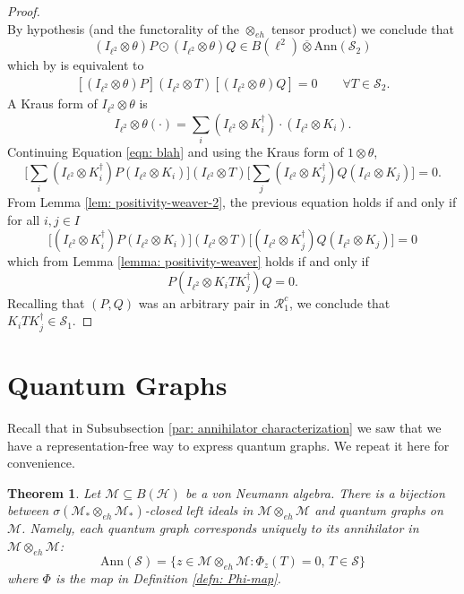 \documentclass[12pt]{article}
\newtheorem{theorem}{Theorem}[section]
\theoremstyle{definition}
\newcommand{\mc}[1]{\mathcal{#1}}
\newcommand{\<}{\langle}
\renewcommand{\>}{\rangle}
\newcommand{\Ann}{\text{Ann}}
\renewcommand{\subset}{\subseteq}
\newcommand{\eh}{\otimes_{eh}}
\begin{document}
\begin{proof}
\[    \]
    By hypothesis (and the functorality of the $\eh$ tensor product) we conclude that 
    \[
    (I_{\ell^2} \otimes \theta)P \odot(I_{\ell^2} \otimes \theta)Q \in B(\ell^2) \overline{\otimes} \Ann(\mc S_2)
    \]
    which by \cite[Theorem 3.3]{gp-obs} is equivalent to
    \begin{align} \label{eqn: blah}
    [(I_{\ell^2} \otimes \theta)P] (I_{\ell^2} \otimes T) [(I_{\ell^2} \otimes \theta)Q] = 0 \qquad \forall T \in \mc S_2.
    \end{align}
    A Kraus form of $I_{\ell^2} \otimes \theta$ is
    \[
    I_{\ell^2} \otimes \theta(\cdot) = \sum_i (I_{\ell^2} \otimes K_i^\dagger ) \cdot (I_{\ell^2} \otimes K_i ).
    \]
    Continuing Equation \ref{eqn: blah} and using the Kraus form of $1 \otimes \theta$,
    \[
    \bigg[\sum_i (I_{\ell^2} \otimes K_i^\dagger ) P(I_{\ell^2} \otimes K_i ) \bigg] (I_{\ell^2} \otimes T) \bigg[\sum_j (I_{\ell^2} \otimes K_j^\dagger ) Q(I_{\ell^2} \otimes K_j ) \bigg] = 0.
    \]
    From Lemma \ref{lem: positivity-weaver-2}, the previous equation holds if and only if for all $i,j \in I$
    \[
    \bigg[(I_{\ell^2} \otimes K_i^\dagger ) P(I_{\ell^2} \otimes K_i )\bigg] (I_{\ell^2} \otimes T) \bigg[(I_{\ell^2} \otimes K_j^\dagger ) Q(I_{\ell^2} \otimes K_j)\bigg]  = 0
    \]
    which from Lemma \ref{lemma: positivity-weaver} holds if and only if
    \[
    P(I_{\ell^2} \otimes K_iTK_j^\dagger) Q  = 0.
    \]
    Recalling that $(P,Q)$ was an arbitrary pair in $\mc R_1^c$, we conclude that $K_iTK_j^\dagger \in \mc S_1$. 
\end{proof}


\section{Quantum Graphs} \label{sec: limits-qgraphs}
Recall that in Subsubsection \ref{par: annihilator characterization} we saw that we have a representation-free way to express quantum graphs. We repeat it here for convenience.

\begin{theorem} 
    Let $\mc M \subset B(\mc H)$ be a von Neumann algebra. There is a bijection between $\sigma(\mc M_* \eh \mc M_*)$-closed left ideals in $\mc M \eh \mc M$ and quantum graphs on $\mc M$. Namely, each quantum graph corresponds uniquely to its annihilator in $\mc M \eh \mc M$:
    \[
    \Ann(\mc S) = \{z \in \mc M \otimes_{eh} \mc M : \Phi_z(T) = 0, \, T \in \mc S\}
    \]
    where $\Phi$ is the map in Definition \ref{defn: Phi-map}.
\end{theorem}
\end{document}
